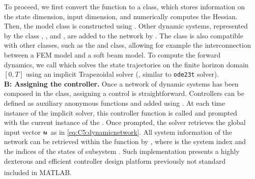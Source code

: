 To proceed, we first convert the function to a  class, which stores information on the state dimension, input dimension, and numerically computes the Hessian. Then, the model class is constructed using . Other dynamic systems, represented by the  class , , and , are added to the network by . The  class is also compatible with other classes, such as the  and  class, allowing for example the interconnection between a FEM model and a soft beam model. To compute the forward dynamics, we call  which solves the state trajectories on the finite horizon domain $[0,T]$ using an implicit Trapezoidal solver (\ie, similar to \texttt{ode23t} solver). \\

\textbf{B: Assigning the controller.} Once a network of dynamic systems has been composed in the  class, assigning a control is straightforward. Controllers can be defined as auxiliary anonymous functions  and added using . At each time instance of the implicit solver, this controller function is called and prompted with the current instance of the . Once prompted, the solver retrieves the global input vector ${\boldsymbol{u}}$ as in \eqref{eq:C5:dynamicnetwork}. All system information of the network can be retrieved within the function by , where  is the system index and  the indices of the states of subsystem . Such implementation presents a highly dexterous and efficient controller design platform previously not standard included in {MATLAB}\textsuperscript{\scriptsize\textregistered}. \\
%

